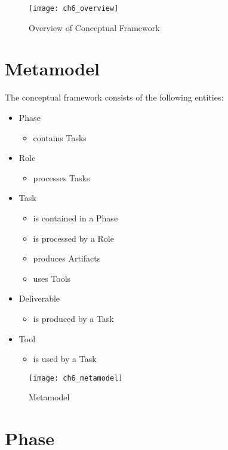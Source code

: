 \begin{figure}
	[htpb] \centering 
	\texttt{[image: ch6\_overview]} \caption{Overview of Conceptual Framework} \label{fig:ch6_overview} 
\end{figure}

\section{Metamodel} 
The conceptual framework consists of the following entities:
\begin{itemize}
	\item Phase
	\begin{itemize}
		\item contains Tasks
	\end{itemize}
	\item Role
	\begin{itemize}
		\item processes Tasks
	\end{itemize}
	\item Task
	\begin{itemize}
		\item is contained in a Phase
		\item is processed by a Role
		\item produces Artifacts
		\item uses Tools
	\end{itemize}
	\item Deliverable
	\begin{itemize}
		\item is produced by a Task
	\end{itemize}
	\item Tool
	\begin{itemize}
		\item is used by a Task
	\end{itemize}
\end{itemize}

\begin{figure}
	[htpb] \centering 
	\texttt{[image: ch6\_metamodel]} 
	\caption{Metamodel} 
	\label{fig:ch6_metamodel} 
\end{figure}

\section{Phase}

